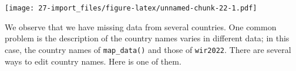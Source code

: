 \documentclass[
  xelatex, ja=standard]{bxjsbook}
\newenvironment{Shaded}{\begin{snugshade}}{\end{snugshade}}
\newcommand{\AttributeTok}[1]{\textcolor[rgb]{0.13,0.29,0.53}{#1}}
\newcommand{\ConstantTok}[1]{\textcolor[rgb]{0.56,0.35,0.01}{#1}}
\newcommand{\DecValTok}[1]{\textcolor[rgb]{0.00,0.00,0.81}{#1}}
\newcommand{\FunctionTok}[1]{\textcolor[rgb]{0.13,0.29,0.53}{\textbf{#1}}}
\newcommand{\NormalTok}[1]{#1}
\newcommand{\OtherTok}[1]{\textcolor[rgb]{0.56,0.35,0.01}{#1}}
\newcommand{\SpecialCharTok}[1]{\textcolor[rgb]{0.81,0.36,0.00}{\textbf{#1}}}
\newcommand{\StringTok}[1]{\textcolor[rgb]{0.31,0.60,0.02}{#1}}
\theoremstyle{definition}
\theoremstyle{definition}
\theoremstyle{definition}
\theoremstyle{definition}
\theoremstyle{remark}
\begin{document}
\begin{Shaded}
\end{Shaded}

\texttt{[image: 27-import\_files/figure-latex/unnamed-chunk-22-1.pdf]}

We observe that we have missing data from several countries. One common problem is the description of the country names varies in different data; in this case, the country names of \texttt{map\_data()} and those of \texttt{wir2022}. There are several ways to edit country names. Here is one of them.
\end{document}
